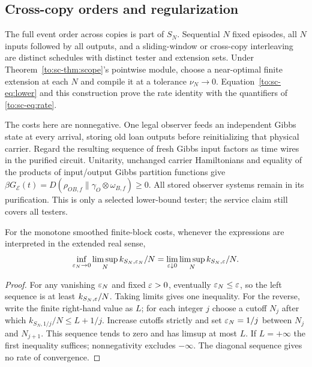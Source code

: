 \subsection{Cross-copy orders and regularization}
The full event order across copies is part of $S_N$. Sequential $N$ fixed episodes, all $N$ inputs followed by all outputs, and a sliding-window or cross-copy interleaving are distinct schedules with distinct tester and extension sets. Under Theorem~\ref{to:sc-thm:scope}'s pointwise module, choose a near-optimal finite extension at each $N$ and compile it at a tolerance $\nu_N\to0$. Equation~\eqref{to:sc-eq:lower} and this construction prove the rate identity with the quantifiers of \eqref{to:sc-eq:rate}.

The costs here are nonnegative. One legal observer feeds an independent Gibbs state at every arrival, storing old loan outputs before reinitializing that physical carrier. Regard the resulting sequence of fresh Gibbs input factors as time wires in the purified circuit. Unitarity, unchanged carrier Hamiltonians and equality of the products of input/output Gibbs partition functions give
$\beta G_{\mathcal E}(t)=D(\rho_{O B,f}\|\gamma_O\otimes\omega_{B,f})\ge0$.
All stored observer systems remain in its purification. This is only a selected lower-bound tester; the service claim still covers all testers.

\begin{lemma}\label{to:sc-lem:diagonal}
For the monotone smoothed finite-block costs, whenever the expressions are interpreted in the extended real sense,
\[
\inf_{\varepsilon_N\to0}\limsup_N k_{S_N,\varepsilon_N}/N
=\lim_{\varepsilon\downarrow0}\limsup_N k_{S_N,\varepsilon}/N.
\]
\end{lemma}
\begin{proof}
For any vanishing $\varepsilon_N$ and fixed $\varepsilon>0$, eventually $\varepsilon_N\le\varepsilon$, so the left sequence is at least $k_{S_N,\varepsilon}/N$. Taking limits gives one inequality. For the reverse, write the finite right-hand value as $L$; for each integer $j$ choose a cutoff $N_j$ after which $k_{S_N,1/j}/N\le L+1/j$. Increase cutoffs strictly and set $\varepsilon_N=1/j$ between $N_j$ and $N_{j+1}$. This sequence tends to zero and has limsup at most $L$. If $L=+\infty$ the first inequality suffices; nonnegativity excludes $-\infty$. The diagonal sequence gives no rate of convergence.
\end{proof}

